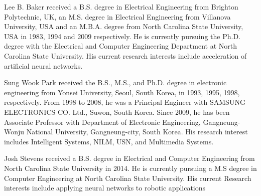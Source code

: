 \documentclass[journal]{IEEEtran}
\begin{document}
% 
\begin{IEEEbiographynophoto}{Lee B. Baker}
received a B.S. degree in Electrical Engineering from Brighton Polytechnic, UK, an M.S. degree in Electrical Engineering from Villanova University, USA and an M.B.A. degree from North Carolina State University, USA in 1983, 1994 and 2009 respectively. He is currently pursuing the Ph.D. degree with the Electrical and Computer Engineering Department at North Carolina State University.
His current research interests include acceleration of artificial neural networks.
\end{IEEEbiographynophoto}
\begin{IEEEbiographynophoto}{Sung Wook Park}
received the B.S., M.S., and Ph.D. degree in electronic engineering from Yonsei University, Seoul, South Korea, in 1993, 1995, 1998, respectively.
From 1998 to 2008, he was a Principal Engineer with SAMSUNG ELECTRONICS CO. Ltd., Suwon, South Korea. Since 2009, he has been Associate Professor with Department of Electronic Engineering, Gangneung-Wonju National University, Gangneung-city, South Korea. His research interest includes Intelligent Systems, NILM, USN, and Multimedia Systems.
\end{IEEEbiographynophoto}
\begin{IEEEbiographynophoto}{Josh Stevens}
received a B.S. degree in Electrical and Computer Engineering from North Carolina State University in 2014. He is currently pursuing a M.S degree in Computer Engineering at North Carolina State University. His current Research interests include applying neural networks to robotic applications\end{IEEEbiographynophoto}
\end{document}
